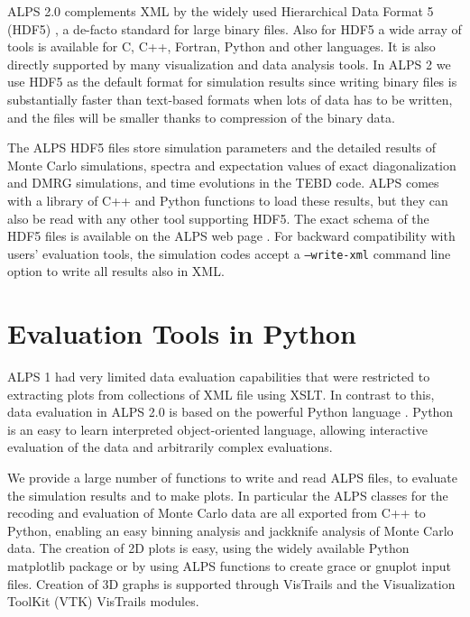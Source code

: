 \documentclass[12pt]{iopart}
\begin{document}
ALPS 2.0 complements XML by the widely used Hierarchical Data Format 5 (HDF5) \cite{hdf5}, a de-facto standard for large binary files.  Also for HDF5 a wide array of tools is 
available for C, C++, Fortran, Python and other languages. It is also directly supported by many visualization and data analysis tools. In ALPS 2 we use HDF5 as the default format for simulation results since writing binary files is substantially faster than text-based formats when lots of data has to be written, and the files will be smaller thanks to compression of the binary data. 

The ALPS HDF5 files store simulation parameters and the detailed results of Monte Carlo simulations, spectra and expectation values of exact diagonalization and DMRG simulations, and time evolutions in the TEBD code. ALPS comes with a library of C++ and Python functions to load these results, but they can also be read with any other tool supporting HDF5. The exact schema of the HDF5 files is available on the ALPS web page \cite{alps}. For backward compatibility with users' evaluation tools, the simulation codes accept a {\tt --write-xml} command line option to write all results also in XML. 

\section{Evaluation Tools in Python}

ALPS 1 had very limited data evaluation capabilities that were restricted to extracting plots from collections of XML file using XSLT. In contrast to this, data evaluation in ALPS 2.0 is based on the powerful Python language \cite{python}. Python is an easy to learn interpreted object-oriented language, allowing interactive evaluation of the data and arbitrarily complex evaluations. 

We provide a large number of functions to write and read ALPS files, to evaluate the simulation results and to make plots. In particular the ALPS classes for the recoding and evaluation of Monte Carlo data are all exported from C++ to Python, enabling an easy binning analysis \cite{Ambegaokar2010} and jackknife analysis of Monte Carlo data.
The creation of 2D plots is easy, using the widely available Python matplotlib package \cite{matplotlib} or by using ALPS functions to create grace \cite{grace} or gnuplot \cite{gnuplot} input files. Creation of 3D graphs is supported through VisTrails and the Visualization ToolKit (VTK) \cite{vtk} VisTrails modules.
\end{document}
